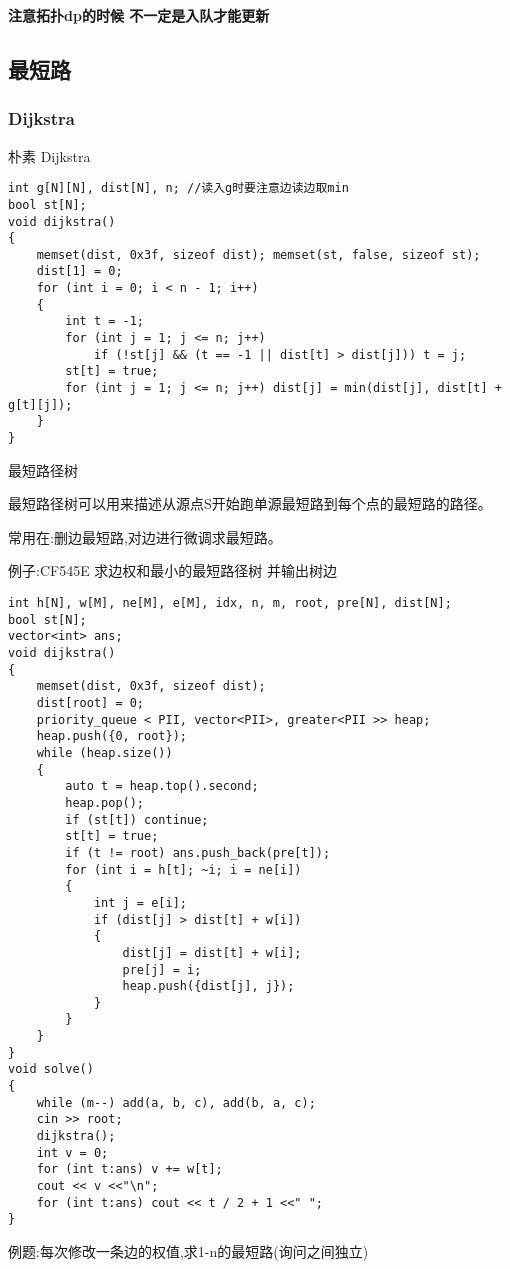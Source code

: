 \documentclass[a4paper, fontset=none]{ctexart}
\begin{document}
\textbf{注意拓扑dp的时候 不一定是入队才能更新}
\subsection{最短路}
\subsubsection{Dijkstra}
朴素 Dijkstra
\begin{verbatim}
int g[N][N], dist[N], n; //读入g时要注意边读边取min
bool st[N];
void dijkstra()
{
    memset(dist, 0x3f, sizeof dist); memset(st, false, sizeof st);
    dist[1] = 0;
    for (int i = 0; i < n - 1; i++)
    {
        int t = -1;
        for (int j = 1; j <= n; j++)
            if (!st[j] && (t == -1 || dist[t] > dist[j])) t = j;
        st[t] = true;
        for (int j = 1; j <= n; j++) dist[j] = min(dist[j], dist[t] + g[t][j]);
    }
}
\end{verbatim}

最短路径树

最短路径树可以用来描述从源点S开始跑单源最短路到每个点的最短路的路径。

常用在:删边最短路,对边进行微调求最短路。

例子:CF545E   求边权和最小的最短路径树 并输出树边

\begin{verbatim}
int h[N], w[M], ne[M], e[M], idx, n, m, root, pre[N], dist[N];
bool st[N];
vector<int> ans;
void dijkstra()
{
    memset(dist, 0x3f, sizeof dist);
    dist[root] = 0;
    priority_queue < PII, vector<PII>, greater<PII >> heap;
    heap.push({0, root});
    while (heap.size())
    {
        auto t = heap.top().second;
        heap.pop();
        if (st[t]) continue;
        st[t] = true;
        if (t != root) ans.push_back(pre[t]);
        for (int i = h[t]; ~i; i = ne[i])
        {
            int j = e[i];
            if (dist[j] > dist[t] + w[i])
            {
                dist[j] = dist[t] + w[i];
                pre[j] = i;
                heap.push({dist[j], j});
            }
        }
    }
}
void solve()
{
    while (m--) add(a, b, c), add(b, a, c);
    cin >> root;
    dijkstra();
    int v = 0;
    for (int t:ans) v += w[t];
    cout << v <<"\n";
    for (int t:ans) cout << t / 2 + 1 <<" ";
}
\end{verbatim}

例题:每次修改一条边的权值,求1-n的最短路(询问之间独立)
\end{document}
